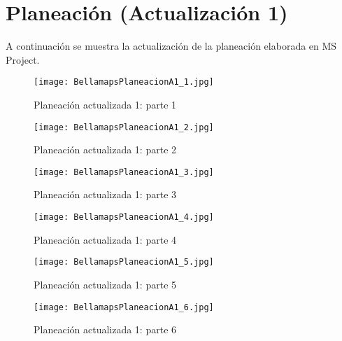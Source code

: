 \newpage

\section{\textcolor{azul}{Planeación (Actualización 1)}}
A continuación se muestra la actualización de la planeación elaborada en MS Project.
\begin{figure}[h]
    \centering
    \texttt{[image: BellamapsPlaneacionA1\_1.jpg]}
    \caption{Planeación actualizada 1: parte 1}
    \label{fig:Planeación actualizada 1 parte 1}
\end{figure}
\begin{figure}[h]
    \centering
    \texttt{[image: BellamapsPlaneacionA1\_2.jpg]}
    \caption{Planeación actualizada 1: parte 2}
    \label{fig:Planeación actualizada 1  parte 2}
\end{figure}
\begin{figure}[h]
    \centering
    \texttt{[image: BellamapsPlaneacionA1\_3.jpg]}
    \caption{Planeación actualizada 1: parte 3}
    \label{fig:Planeación actualizada 1  parte 3}
\end{figure}
\begin{figure}[h]
    \centering
    \texttt{[image: BellamapsPlaneacionA1\_4.jpg]}
    \caption{Planeación actualizada 1: parte 4}
    \label{fig:Planeación actualizada 1  parte 4}
\end{figure}
\begin{figure}[h]
    \centering
    \texttt{[image: BellamapsPlaneacionA1\_5.jpg]}
    \caption{Planeación actualizada 1: parte 5}
    \label{fig:Planeación actualizada 1  parte 5}
\end{figure}
\begin{figure}[h]
    \centering
    \texttt{[image: BellamapsPlaneacionA1\_6.jpg]}
    \caption{Planeación actualizada 1: parte 6}
    \label{fig:Planeación actualizada 1  parte 6}
\end{figure}
